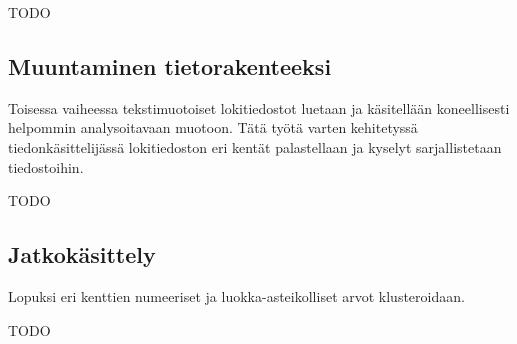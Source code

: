 TODO

\subsection{Muuntaminen tietorakenteeksi}

Toisessa vaiheessa tekstimuotoiset lokitiedostot luetaan ja
käsitellään koneellisesti helpommin analysoitavaan
muotoon. Tätä työtä varten kehitetyssä tiedonkäsittelijässä
lokitiedoston eri kentät palastellaan ja kyselyt sarjallistetaan tiedostoihin.

TODO

\subsection{Jatkokäsittely}

Lopuksi eri kenttien numeeriset ja
luokka-asteikolliset arvot klusteroidaan.

TODO

